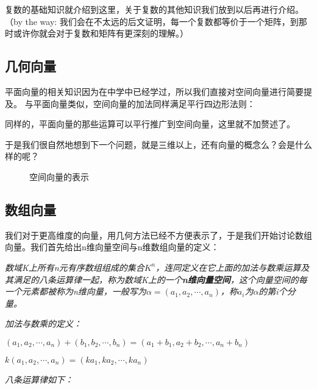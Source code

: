 \documentclass[a4paper]{ctexart}
\begin{document}
复数的基础知识就介绍到这里，关于复数的其他知识我们放到以后再进行介绍。（by the way: 我们会在不太远的后文证明，每一个复数都等价于一个矩阵，到那时或许你就会对于复数和矩阵有更深刻的理解。）

\subsection{几何向量}
平面向量的相关知识因为在中学中已经学过，所以我们直接对空间向量进行简要提及。
与平面向量类似，空间向量的加法同样满足平行四边形法则：

同样的，平面向量的那些运算可以平行推广到空间向量，这里就不加赘述了。

于是我们很自然地想到下一个问题，就是三维以上，还有向量的概念么？会是什么样的呢？

\begin{figure}[htp]
\centering
{}
\caption{空间向量的表示}
\end{figure}

\subsection{数组向量}
我们对于更高维度的向量，用几何方法已经不方便表示了，于是我们开始讨论数组向量。我们首先给出n维向量空间与n维数组向量的定义：

\textit{数域K上所有n元有序数组组成的集合$K^n$，连同定义在它上面的加法与数乘运算及其满足的八条运算律一起，称为数域K上的一个\textbf{n维向量空间}，这个向量空间的每一个元素都被称为n维向量，一般写为$\alpha =(a_1,a_2,\cdots,a_n)$，称$a_i$为$\alpha$的第i个分量。}

\textit{加法与数乘的定义：}

\textit{$(a_1,a_2,\cdots,a_n)+(b_1,b_2,\cdots,b_n)=(a_1+b_1,a_2+b_2,\cdots,a_n+b_n)$}

\textit{$k(a_1,a_2,\cdots,a_n)=(ka_1,ka_2,\cdots,ka_n)$}

\textit{八条运算律如下：}
\end{document}
